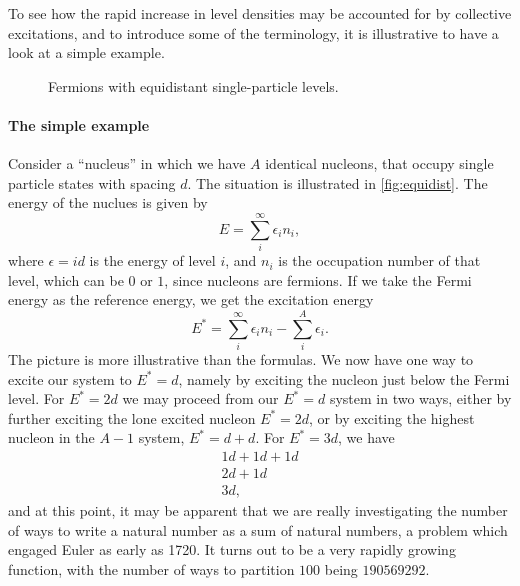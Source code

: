 To see how the rapid increase in level densities may be accounted for by collective excitations, and to introduce some of the terminology, it is illustrative to have a look at a simple example.

\begin{figure}

\caption{\label{fig:equidist} Fermions with equidistant single-particle levels.}
\end{figure}

\paragraph{The simple example}
Consider a ``nucleus'' in which we have $A$ identical nucleons, that occupy single particle states with spacing $d$. The situation is illustrated in \autoref{fig:equidist}. The energy of the nuclues is given by 
\begin{equation}
E=\sum_i^\infty \epsilon_i n_i,
\end{equation}
where $\epsilon = id$ is the energy of level $i$, and $n_i$ is the occupation number of that level, which can be $0$ or $1$, since nucleons are fermions.
If we take the Fermi energy as the reference energy, we get the excitation energy
\begin{equation}
E^*=\sum_i^\infty \epsilon_i n_i - \sum_i^A \epsilon_i.
\end{equation}
The picture is more illustrative than the formulas. We now have one way to excite our system to $E^*=d$, namely by exciting the nucleon just below the Fermi level. For $E^*=2d$ we may proceed from our $E^*=d$ system in two ways, either by further exciting the lone excited nucleon $E^* = 2d$, or by exciting the highest nucleon in the $A-1$ system, $E^*=d+d$. For $E^*=3d$, we have
\begin{equation}
\begin{aligned}
1d+1d+1d \\
2d+1d \\
3d,
\end{aligned}
\end{equation}
and at this point, it may be apparent that we are really investigating the number of ways to write a natural number as a sum of natural numbers, a problem which engaged Euler as early as 1720\cite{mathworld}. It turns out to be a very rapidly growing function, with the number of ways to partition $100$ being $190 569 292$\cite{mathworld}.


